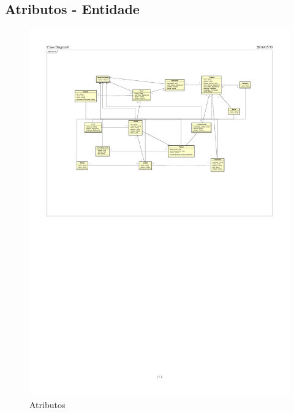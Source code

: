 \documentclass[chapter=TITLE,12pt,oneside,a4paper,english,french,sumario=tradicional,spanish,brazil,]{abntex2}
\begin{document}
\subsection{Atributos - Entidade}
\begin{figure}[H]\centering
\includegraphics[scale=1.1]{atributo2.pdf}\caption{Atributos}
\end{figure}

\newpage
\end{document}
